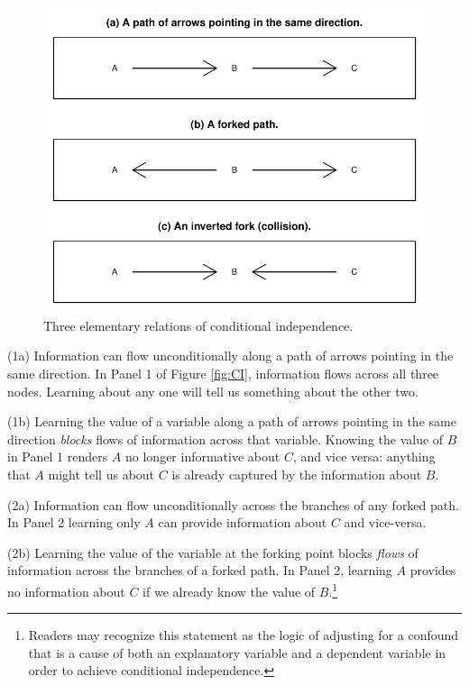 \documentclass[12pt,]{book}
\let\rmarkdownfootnote\footnote%
\def\footnote{\protect\rmarkdownfootnote}
\begin{document}
\begin{figure}

{\centering \includegraphics[width=.9\textwidth]{ii_files/figure-latex/unnamed-chunk-6-1} 

}

\caption{\label{fig:CI} Three elementary relations of conditional independence.}\label{fig:unnamed-chunk-6}
\end{figure}

(1a) Information can flow unconditionally along a path of arrows pointing in the same direction. In Panel 1 of Figure \ref{fig:CI}, information flows across all three nodes. Learning about any one will tell us something about the other two.

(1b) Learning the value of a variable along a path of arrows pointing in the same direction \emph{blocks} flows of information across that variable. Knowing the value of \(B\) in Panel 1 renders \(A\) no longer informative about \(C\), and vice versa: anything that \(A\) might tell us about \(C\) is already captured by the information about \(B\).

(2a) Information can flow unconditionally across the branches of any forked path. In Panel 2 learning only \(A\) can provide information about \(C\) and vice-versa.

(2b) Learning the value of the variable at the forking point blocks \emph{flows} of information across the branches of a forked path. In Panel 2, learning \(A\) provides no information about \(C\) if we already know the value of \(B\).\footnote{Readers may recognize this statement as the logic of adjusting for a confound that is a cause of both an explanatory variable and a dependent variable in order to achieve conditional independence.}
\end{document}
